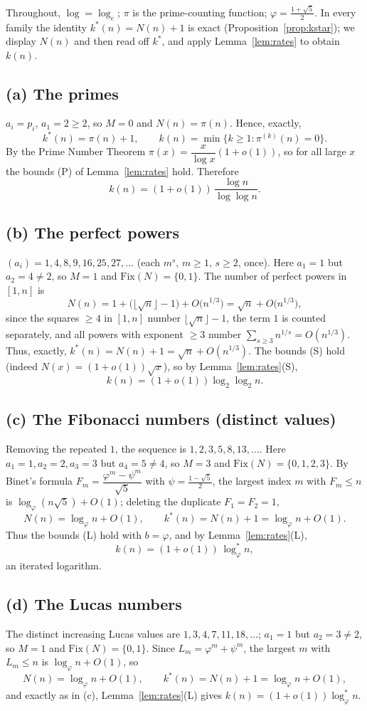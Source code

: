 \documentclass[12pt]{article}
\theoremstyle{definition}
\begin{document}
Throughout, $\log=\log_e$; $\pi$ is the prime-counting function;
$\varphi=\tfrac{1+\sqrt5}2$. In every family the identity $k^*(n)=N(n)+1$ is exact
(Proposition~\ref{prop:kstar}); we display $N(n)$ and then read off $k^*$, and apply
Lemma~\ref{lem:rates} to obtain $k(n)$.

\subsection{(a) The primes}
$a_i=p_i$, $a_1=2\ge2$, so $M=0$ and $N(n)=\pi(n)$. Hence, exactly,
\[
  k^*(n)=\pi(n)+1,\qquad k(n)=\min\{k\ge1:\pi^{(k)}(n)=0\}.
\]
By the Prime Number Theorem $\pi(x)=\dfrac{x}{\log x}(1+o(1))$, so for all large $x$
the bounds (P) of Lemma~\ref{lem:rates} hold. Therefore
\[
  k(n)=(1+o(1))\,\frac{\log n}{\log\log n}.
\]

\subsection{(b) The perfect powers}
$(a_i)=1,4,8,9,16,25,27,\dots$ (each $m^s$, $m\ge1$, $s\ge2$, once). Here $a_1=1$ but
$a_2=4\ne2$, so $M=1$ and $\mathrm{Fix}(N)=\{0,1\}$. The number of perfect powers in
$[1,n]$ is
\[
  N(n)=1+\bigl(\lfloor\sqrt n\rfloor-1\bigr)+O\!\bigl(n^{1/3}\bigr)
      =\sqrt n+O\!\bigl(n^{1/3}\bigr),
\]
since the squares $\ge4$ in $[1,n]$ number $\lfloor\sqrt n\rfloor-1$, the term $1$ is
counted separately, and all powers with exponent $\ge3$ number
$\sum_{s\ge3}n^{1/s}=O(n^{1/3})$. Thus, exactly, $k^*(n)=N(n)+1=\sqrt n+O(n^{1/3})$.
The bounds (S) hold (indeed $N(x)=(1+o(1))\sqrt x$), so by Lemma~\ref{lem:rates}(S),
\[
  k(n)=(1+o(1))\log_2\log_2 n.
\]

\subsection{(c) The Fibonacci numbers (distinct values)}
Removing the repeated $1$, the sequence is $1,2,3,5,8,13,\dots$. Here $a_1=1,a_2=2,
a_3=3$ but $a_4=5\ne4$, so $M=3$ and $\mathrm{Fix}(N)=\{0,1,2,3\}$. By Binet's formula
$F_m=\dfrac{\varphi^m-\psi^m}{\sqrt5}$ with $\psi=\tfrac{1-\sqrt5}2$, the largest
index $m$ with $F_m\le n$ is $\log_\varphi(n\sqrt5)+O(1)$; deleting the duplicate
$F_1=F_2=1$,
\[
  N(n)=\log_\varphi n+O(1),\qquad k^*(n)=N(n)+1=\log_\varphi n+O(1).
\]
Thus the bounds (L) hold with $b=\varphi$, and by Lemma~\ref{lem:rates}(L),
\[
  k(n)=(1+o(1))\,\log^*_\varphi n,
\]
an iterated logarithm.

\subsection{(d) The Lucas numbers}
The distinct increasing Lucas values are $1,3,4,7,11,18,\dots$; $a_1=1$ but $a_2=3\ne2$,
so $M=1$ and $\mathrm{Fix}(N)=\{0,1\}$. Since $L_m=\varphi^m+\psi^m$, the largest $m$
with $L_m\le n$ is $\log_\varphi n+O(1)$, so
\[
  N(n)=\log_\varphi n+O(1),\qquad k^*(n)=N(n)+1=\log_\varphi n+O(1),
\]
and exactly as in (c), Lemma~\ref{lem:rates}(L) gives
$k(n)=(1+o(1))\log^*_\varphi n$.
\end{document}
